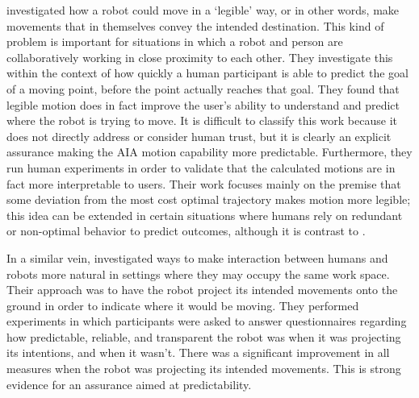 \citet{Dragan2013-wd} investigated how a robot could move in a `legible' way, or in other words, make movements that in themselves convey the intended destination. This kind of problem is important for situations in which a robot and person are collaboratively working in close proximity to each other. They investigate this within the context of how quickly a human participant is able to predict the goal of a moving point, before the point actually reaches that goal. They found that legible motion does in fact improve the user's ability to understand and predict where the robot is trying to move. It is difficult to classify this work because it does not directly address or consider human trust, but it is clearly an explicit assurance making the AIA motion capability more predictable. Furthermore, they run human experiments in order to validate that the calculated motions are in fact more interpretable to users. Their work focuses mainly on the premise that some deviation from the most cost optimal trajectory makes motion more legible; this idea can be extended in certain situations where humans rely on redundant or non-optimal behavior to predict outcomes, although it is contrast to \citet{Wu2016-ei}.

In a similar vein, \citet{Chadalavada2015-wx} investigated ways to make interaction between humans and robots more natural  in settings where they may occupy the same work space. Their approach was to have the robot project its intended movements onto the ground in order to indicate where it would be moving. They performed experiments in which participants were asked to answer questionnaires regarding how predictable, reliable, and transparent the robot was when it was projecting its intentions, and when it wasn't. There was a significant improvement in all measures when the robot was projecting its intended movements. This is strong evidence for an assurance aimed at predictability. 

